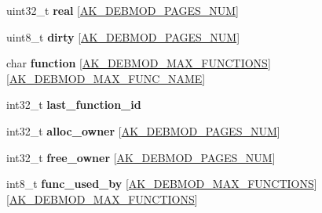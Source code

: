 \begin{DoxyCompactItemize}
\item 
\mbox{\label{structAK__debmod__state_a78dac4356e301173462f3cf266c11d46}} 
uint32\+\_\+t {\bfseries real} \mbox{[}\hyperlink{mempro_8h_a51cd45bb30d86f207631ecef36db7f14}{A\+K\+\_\+\+D\+E\+B\+M\+O\+D\+\_\+\+P\+A\+G\+E\+S\+\_\+\+N\+UM}\mbox{]}
\item 
\mbox{\label{structAK__debmod__state_ae41cd9475b6a3cfa3869badd549bd3df}} 
uint8\+\_\+t {\bfseries dirty} \mbox{[}\hyperlink{mempro_8h_a51cd45bb30d86f207631ecef36db7f14}{A\+K\+\_\+\+D\+E\+B\+M\+O\+D\+\_\+\+P\+A\+G\+E\+S\+\_\+\+N\+UM}\mbox{]}
\item 
\mbox{\label{structAK__debmod__state_a6a672dfaa477a8e911529e2f5c52d504}} 
char {\bfseries function} \mbox{[}\hyperlink{mempro_8h_a3bc510cef53200a73266e5cb88c9a91b}{A\+K\+\_\+\+D\+E\+B\+M\+O\+D\+\_\+\+M\+A\+X\+\_\+\+F\+U\+N\+C\+T\+I\+O\+NS}\mbox{]}\mbox{[}\hyperlink{mempro_8h_a9505b476b379260a14d3c88e601fd536}{A\+K\+\_\+\+D\+E\+B\+M\+O\+D\+\_\+\+M\+A\+X\+\_\+\+F\+U\+N\+C\+\_\+\+N\+A\+ME}\mbox{]}
\item 
\mbox{\label{structAK__debmod__state_acb7fb1f5af7f5e46e49e4cf76794e1ae}} 
int32\+\_\+t {\bfseries last\+\_\+function\+\_\+id}
\item 
\mbox{\label{structAK__debmod__state_a978629144c9c7e39acc42c127cec2e1c}} 
int32\+\_\+t {\bfseries alloc\+\_\+owner} \mbox{[}\hyperlink{mempro_8h_a51cd45bb30d86f207631ecef36db7f14}{A\+K\+\_\+\+D\+E\+B\+M\+O\+D\+\_\+\+P\+A\+G\+E\+S\+\_\+\+N\+UM}\mbox{]}
\item 
\mbox{\label{structAK__debmod__state_a9d5ac904793e4486e5bb39949fea48d8}} 
int32\+\_\+t {\bfseries free\+\_\+owner} \mbox{[}\hyperlink{mempro_8h_a51cd45bb30d86f207631ecef36db7f14}{A\+K\+\_\+\+D\+E\+B\+M\+O\+D\+\_\+\+P\+A\+G\+E\+S\+\_\+\+N\+UM}\mbox{]}
\item 
\mbox{\label{structAK__debmod__state_ab4df3d1b2a021b427a1a59551b3b9854}} 
int8\+\_\+t {\bfseries func\+\_\+used\+\_\+by} \mbox{[}\hyperlink{mempro_8h_a3bc510cef53200a73266e5cb88c9a91b}{A\+K\+\_\+\+D\+E\+B\+M\+O\+D\+\_\+\+M\+A\+X\+\_\+\+F\+U\+N\+C\+T\+I\+O\+NS}\mbox{]}\mbox{[}\hyperlink{mempro_8h_a3bc510cef53200a73266e5cb88c9a91b}{A\+K\+\_\+\+D\+E\+B\+M\+O\+D\+\_\+\+M\+A\+X\+\_\+\+F\+U\+N\+C\+T\+I\+O\+NS}\mbox{]}

\end{DoxyCompactItemize}

